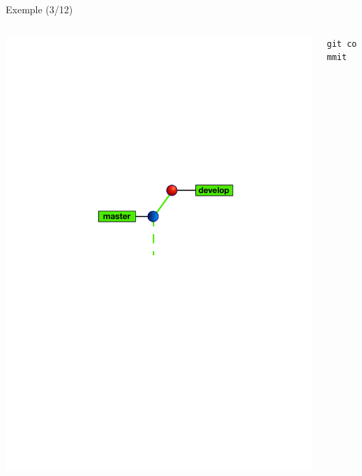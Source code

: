 \begin{frame}[fragile]{%
\protect\hypertarget{exemple-312}{%
Exemple (3/12)}}

\begin{columns}[T]
\begin{column}{0.40\textwidth}
\includegraphics[width=1\textwidth]{images/branch3.pdf}
\end{column}

\begin{column}{0.60\textwidth}
\texttt{git\ commit}
\end{column}
\end{columns}

\end{frame}


